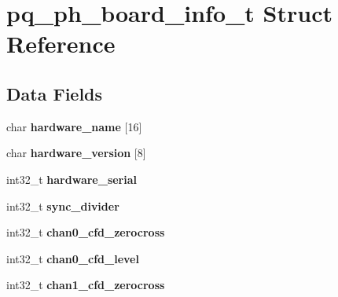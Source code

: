 \hypertarget{structpq__ph__board__info__t}{}\section{pq\+\_\+ph\+\_\+board\+\_\+info\+\_\+t Struct Reference}
\label{structpq__ph__board__info__t}
\subsection*{Data Fields}
\begin{DoxyCompactItemize}
\item 
\hypertarget{structpq__ph__board__info__t_ace227217a4d19f26d14ec293d2a009e5}{}char {\bfseries hardware\+\_\+name} \mbox{[}16\mbox{]}\label{structpq__ph__board__info__t_ace227217a4d19f26d14ec293d2a009e5}

\item 
\hypertarget{structpq__ph__board__info__t_a3cc92fc7af4a51e572e5373ef2c897bd}{}char {\bfseries hardware\+\_\+version} \mbox{[}8\mbox{]}\label{structpq__ph__board__info__t_a3cc92fc7af4a51e572e5373ef2c897bd}

\item 
\hypertarget{structpq__ph__board__info__t_a6afa350e3ae7140099688f8c5c825456}{}int32\+\_\+t {\bfseries hardware\+\_\+serial}\label{structpq__ph__board__info__t_a6afa350e3ae7140099688f8c5c825456}

\item 
\hypertarget{structpq__ph__board__info__t_a8c44e4a0f96e4bf20a4eea6852ce8d6b}{}int32\+\_\+t {\bfseries sync\+\_\+divider}\label{structpq__ph__board__info__t_a8c44e4a0f96e4bf20a4eea6852ce8d6b}

\item 
\hypertarget{structpq__ph__board__info__t_ac0e0525cce7504a06f1c10eabf33cf19}{}int32\+\_\+t {\bfseries chan0\+\_\+cfd\+\_\+zerocross}\label{structpq__ph__board__info__t_ac0e0525cce7504a06f1c10eabf33cf19}

\item 
\hypertarget{structpq__ph__board__info__t_a89bdbe43d1d6dd595fb1fcdad034f629}{}int32\+\_\+t {\bfseries chan0\+\_\+cfd\+\_\+level}\label{structpq__ph__board__info__t_a89bdbe43d1d6dd595fb1fcdad034f629}

\item 
\hypertarget{structpq__ph__board__info__t_ac18d4b2de688211d05678e9e5c0411eb}{}int32\+\_\+t {\bfseries chan1\+\_\+cfd\+\_\+zerocross}\label{structpq__ph__board__info__t_ac18d4b2de688211d05678e9e5c0411eb}


\end{DoxyCompactItemize}
